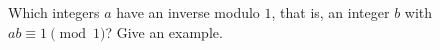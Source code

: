 Which integers $a$ have an inverse modulo $1$, that is, an integer $b$ with $ab\equiv1\pmod 1$? Give an example.
